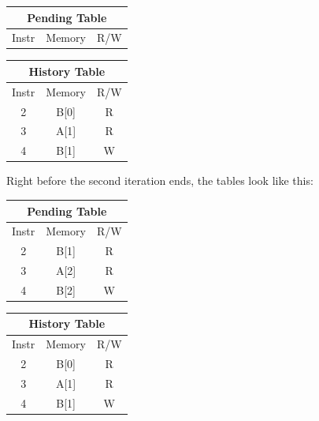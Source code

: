 \documentclass[12pt,twoside]{reedthesis}
\begin{document}
		
		\begin{minipage}{1.0\linewidth}
		\begin{minipage}[t]{.5\linewidth}
		
		\begin{tabular}[b]{ |c|c|c| } 
			\hline
			\multicolumn{3}{|c|}{Pending Table} \\
			\hline
			Instr & Memory & R/W \\ 
			\hline
			\hline
		\end{tabular}
		\end{minipage}%
		\begin{minipage}[t]{.5\linewidth}
		\begin{tabular}{ |c|c|c| } 
			\hline
			\multicolumn{3}{|c|}{History Table} \\
			\hline
			Instr & Memory & R/W \\ 
			\hline
			2 & B[0] & R \\ 
			3 & A[1] & R \\ 
			4 & B[1] & W \\ 
			\hline
		\end{tabular}
		\end{minipage}
	\end{minipage}
		
		Right before the second iteration ends, the tables look like this:
			
		\begin{minipage}{1.0\linewidth}
		\begin{minipage}[t]{.5\linewidth}
		\begin{tabular}{ |c|c|c| } 
			\hline
			\multicolumn{3}{|c|}{Pending Table} \\
			\hline
			Instr & Memory & R/W \\ 
			\hline
			2 & B[1] & R \\ 
			3 & A[2] & R \\ 
			4 & B[2] & W \\ 
			\hline
		\end{tabular}
		\end{minipage}%
		\begin{minipage}[t]{.5\linewidth}
		\begin{tabular}{ |c|c|c| } 
			\hline
			\multicolumn{3}{|c|}{History Table} \\
			\hline
			Instr & Memory & R/W \\ 
			\hline
			2 & B[0] & R \\ 
			3 & A[1] & R \\ 
			4 & B[1] & W \\ 
			\hline
		\end{tabular}
		\end{minipage}%
		\end{minipage}%
	
\end{document}
